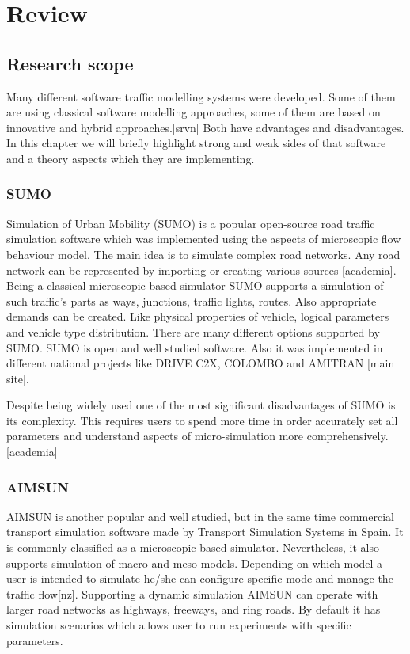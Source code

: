 \begin{itemize}
\begin{itemize}
	\end{itemize}
\end{itemize}

\section{Review}

\subsection{Research scope}

Many different software traffic modelling systems were developed.
Some of them are using classical software modelling approaches, some of them are based on innovative and hybrid approaches.[srvn]
Both have advantages and disadvantages.
In this chapter we will briefly highlight strong and weak sides of that software  and a theory  aspects which they are implementing.


\subsubsection{SUMO}

Simulation of Urban Mobility (SUMO) is a popular open-source road traffic simulation software which was implemented using the aspects of microscopic flow behaviour model.
The main idea is to simulate complex road networks. Any road network can be represented by importing or creating various sources [academia].
Being a classical microscopic based simulator SUMO supports a simulation of such traffic's parts as ways, junctions, traffic lights, routes.
Also appropriate demands can be created. Like physical properties of vehicle, logical parameters and vehicle type distribution.
There are many different options supported by SUMO.
SUMO is open and well studied software. Also it was implemented in different national projects like DRIVE C2X, COLOMBO and AMITRAN [main site].

Despite being widely used one of the most significant disadvantages of SUMO is its complexity.
This requires users to spend more time in order accurately set
all parameters and understand aspects of micro-simulation more comprehensively. [academia]

\subsubsection{AIMSUN}

AIMSUN is another popular and well studied, but in the same time commercial
transport simulation software made by Transport Simulation Systems in Spain.
It is commonly classified as a microscopic based simulator.
Nevertheless, it also supports simulation of macro and meso models.
Depending on which model a user is intended to simulate he/she can configure specific mode and manage the traffic flow[nz].
Supporting a dynamic simulation AIMSUN can operate with larger road networks as highways, freeways, and ring roads.
By default it has simulation scenarios which allows user to run experiments with specific parameters.

